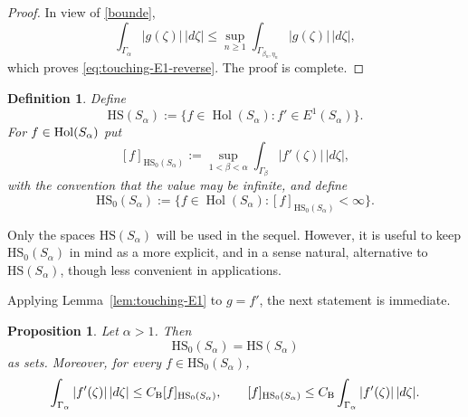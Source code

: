 \documentclass[11pt]{amsart}
\numberwithin{equation}{section}
\newtheorem{lemma}[theorem]{Lemma}
\newtheorem{definition}[theorem]{Definition}
\newtheorem{proposition}[theorem]{Proposition}
\theoremstyle{definition}
\theoremstyle{plain}
\newcommand{\HS}{\mathrm{HS}}
\begin{document}
\begin{proof}
In view of \eqref{bounde},
\[
        \int_{\Gamma_\alpha}|g(\zeta)|\,|d\zeta|
        \le
        \sup_{n\ge 1} \int_{\Gamma_{\beta_n,\eta_n}}
        |g(\zeta)|\,|d\zeta|,
\]
which proves  \eqref{eq:touching-E1-reverse}.
The proof is complete.
\end{proof}





\begin{definition}\label{def:HS0}
Define
\[
\HS(S_\alpha):= \{f\in \operatorname{Hol}(S_\alpha): f'\in E^1(S_\alpha)\}.
\]
For \(f\in {\rm Hol} (S_\alpha)\)
 put
\[
        [f]_{\HS_0(S_\alpha)}
        :=
        \sup_{1<\beta<\alpha}
        \int_{\Gamma_\beta}|f'(\zeta)|\,|d\zeta|,
\]
with the convention that the value may be infinite, and define
\[
        \HS_0(S_\alpha)
        :=
 \{f\in \operatorname{Hol}(S_\alpha):[f]_{\HS_0(S_\alpha)}<\infty\}.
 \]
\end{definition}

Only the spaces \(\HS(S_\alpha)\) will be used in the sequel.  However,
it is useful to keep \(\HS_0(S_\alpha)\) in mind as a more explicit,
and in a sense natural,
alternative to \(\HS(S_\alpha)\), though less convenient in applications.

Applying Lemma~\ref{lem:touching-E1} to \(g=f'\), the next statement is immediate.
\begin{proposition}\label{prop:touching-E1-main}
Let \(\alpha>1\).  Then
\[
        \HS_0(S_\alpha)=\HS(S_\alpha)
\]
as sets.  Moreover, for every \(f\in\HS_0(S_\alpha)\),
\begin{equation}\label{eq:HS-E1-equivalence}
        \int_{\Gamma_\alpha}|f'(\zeta)|\,|d\zeta|
        \le
        C_{\rm B} [f]_{\HS_0(S_\alpha)},
        \qquad
        [f]_{\HS_0(S_\alpha)}
        \le
        C_{\rm B}
        \int_{\Gamma_\alpha}|f'(\zeta)|\,|d\zeta|.
\end{equation}

\end{proposition}
\end{document}
